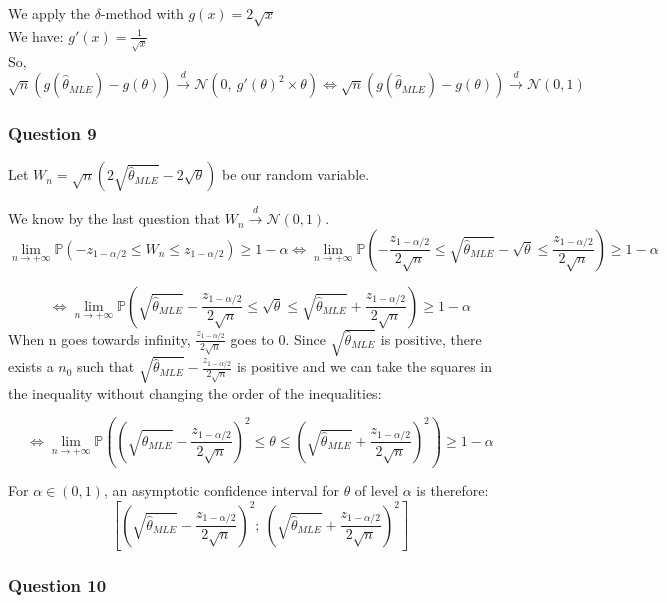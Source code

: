 \documentclass[]{article}
\begin{document}
We apply the \(\delta\)-method with \(g(x) = 2 \sqrt{x}\)\\
We have: \(g'(x) = \frac {1} {\sqrt{x}}\)\\
So, \[
\sqrt{n} (g(\hat \theta_{MLE}) - g(\theta)) \overset{d} {\to} \mathcal{N}(0,\ g'(\theta)^2 \times \theta) \Leftrightarrow \sqrt{n} (g(\hat \theta_{MLE}) - g(\theta)) \overset{d} {\to} \mathcal{N}(0,1)
\]

\hypertarget{question-9}{%
\subsubsection{Question 9}\label{question-9}}

Let \(W_n = \sqrt{n} (2 \sqrt{\hat\theta_{MLE}} - 2 \sqrt{\theta})\) be
our random variable.

We know by the last question that
\(W_n \overset{d} {\to} \mathcal{N}(0,1)\). \[
\lim \limits_{n \rightarrow + \infty} \mathbb{P} (-z_{1-\alpha/2} \leq W_n \leq z_{1-\alpha/2}) \geq 1- \alpha \Leftrightarrow \lim \limits_{n \rightarrow + \infty} \mathbb{P}(- \frac {z_{1-\alpha/2}} {2 \sqrt{n}} \leq \sqrt{\hat\theta_{MLE}} - \sqrt{\theta} \leq \frac {z_{1-\alpha/2}} {2 \sqrt{n}}) \geq 1- \alpha
\]

\[
 \Leftrightarrow \lim \limits_{n \rightarrow + \infty} \mathbb{P} (\sqrt{\hat\theta_{MLE}} - \frac {z_{1-\alpha/2}} {2 \sqrt{n}} \leq \sqrt{\theta} \leq \sqrt{\hat\theta_{MLE}} + \frac {z_{1-\alpha/2}} {2 \sqrt{n}}) \geq 1- \alpha
\] When n goes towards infinity, \(\frac {z_{1-\alpha/2}} {2 \sqrt{n}}\)
goes to 0. Since \(\sqrt{\hat\theta_{MLE}}\) is positive, there exists a
\(n_0\) such that
\(\sqrt{\hat\theta_{MLE}} - \frac {z_{1-\alpha/2}} {2 \sqrt{n}}\) is
positive and we can take the squares in the inequality without changing
the order of the inequalities:

\[
\Leftrightarrow \lim \limits_{n \rightarrow + \infty} \mathbb{P} ((\sqrt{\hat\theta_{MLE}} - \frac {z_{1-\alpha/2}} {2 \sqrt{n}})^2 \leq \theta \leq (\sqrt{\hat\theta_{MLE}} + \frac {z_{1-\alpha/2}} {2 \sqrt{n}})^2) \geq 1- \alpha
\]

For \(\alpha \in (0, 1)\), an asymptotic confidence interval for
\(\theta\) of level \(\alpha\) is therefore: \[
[(\sqrt{\hat\theta_{MLE}} - \frac {z_{1-\alpha/2}} {2 \sqrt{n}})^2 ;\ (\sqrt{\hat\theta_{MLE}} + \frac {z_{1-\alpha/2}} {2 \sqrt{n}})^2]
\]

\hypertarget{question-10}{%
\subsubsection{Question 10}\label{question-10}}
\end{document}
